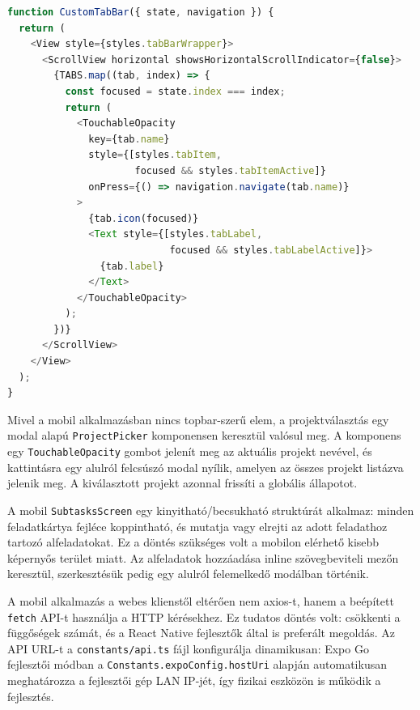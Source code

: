 \begin{lstlisting}[language=JavaScript, caption={Egyedi tab bar implementáció (layout.tsx)}]
function CustomTabBar({ state, navigation }) {
  return (
    <View style={styles.tabBarWrapper}>
      <ScrollView horizontal showsHorizontalScrollIndicator={false}>
        {TABS.map((tab, index) => {
          const focused = state.index === index;
          return (
            <TouchableOpacity
              key={tab.name}
              style={[styles.tabItem,
                      focused && styles.tabItemActive]}
              onPress={() => navigation.navigate(tab.name)}
            >
              {tab.icon(focused)}
              <Text style={[styles.tabLabel,
                            focused && styles.tabLabelActive]}>
                {tab.label}
              </Text>
            </TouchableOpacity>
          );
        })}
      </ScrollView>
    </View>
  );
}
\end{lstlisting}


Mivel a mobil alkalmazásban nincs topbar-szerű elem, a projektválasztás egy modal alapú \texttt{ProjectPicker} komponensen keresztül valósul meg. A komponens egy \texttt{TouchableOpacity} gombot jelenít meg az aktuális projekt nevével, és kattintásra egy alulról felcsúszó modal nyílik, amelyen az összes projekt listázva jelenik meg. A kiválasztott projekt azonnal frissíti a globális állapotot.


A mobil \texttt{SubtasksScreen} egy kinyitható/becsukható struktúrát alkalmaz: minden feladatkártya fejléce koppintható, és mutatja vagy elrejti az adott feladathoz tartozó alfeladatokat. Ez a döntés szükséges volt a mobilon elérhető kisebb képernyős terület miatt. Az alfeladatok hozzáadása inline szövegbeviteli mezőn keresztül, szerkesztésük pedig egy alulról felemelkedő modálban történik.


A mobil alkalmazás a webes klienstől eltérően nem axios-t, hanem a beépített \texttt{fetch} API-t használja a HTTP kérésekhez. Ez tudatos döntés volt: csökkenti a függőségek számát, és a React Native fejlesztők által is preferált megoldás. Az API URL-t a \texttt{constants/api.ts} fájl konfigurálja dinamikusan: Expo Go fejlesztői módban a \texttt{Constants.expoConfig.hostUri} alapján automatikusan meghatározza a fejlesztői gép LAN IP-jét, így fizikai eszközön is működik a fejlesztés.

